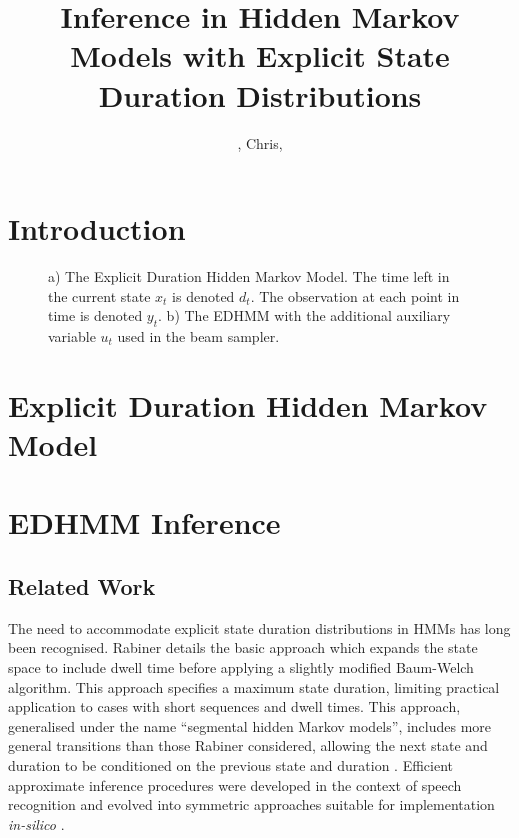 \documentclass[journal]{oldtran/IEEEtran}
\title{Inference in Hidden Markov Models with Explicit State Duration Distributions}
\author{\mike{Mike}, Chris, \frank{Frank}}
\begin{document}
    
\maketitle

\begin{abstract}

\end{abstract}

\section{Introduction}



    \begin{figure}[t]
        \centering
        \caption{a) The Explicit Duration Hidden Markov Model. The time left in the current state $x_t$ is denoted $d_t$. The observation at each point in time is denoted $y_t$. b) The EDHMM with the additional auxiliary variable $u_t$ used in the beam sampler.}
    \label{fig:graphs}    
    \end{figure}
\section{Explicit Duration Hidden Markov Model}
\label{sec:Model}





\section{EDHMM Inference}

\label{sec:inference}




\subsection{Related Work}

The need to accommodate explicit state duration distributions in HMMs has long been recognised. Rabiner \cite{Rabiner89} details the basic approach which expands the state space to include dwell time before applying a slightly modified Baum-Welch algorithm. This approach specifies a maximum state duration, limiting practical application 
to cases with short sequences and dwell times.
This approach, generalised under the name ``segmental hidden Markov models'', includes more general transitions than those Rabiner considered, allowing the next state and duration to be conditioned on the previous state and duration \cite{Gales93}. Efficient approximate inference procedures were developed in the context of speech recognition \cite{Ostendorf96} and evolved into symmetric approaches suitable for implementation \emph{in-silico} \cite{Yu2006}.
\end{document}
